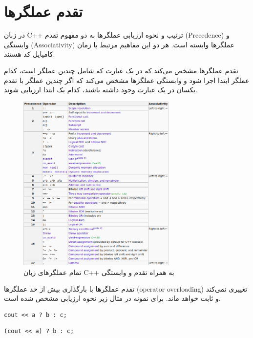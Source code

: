 \documentclass{article}
\begin{document}
\section*{تقدم عملگر‌ها}

در زبان C++ ترتیب و نحوه ارزیابی عملگر‌ها به دو مفهوم تقدم (Precedence) و وابستگی (Associativity) عملگر‌ها وابسته است. هر دو این مفاهیم مرتبط با زمان کامپایل کد هستند.

تقدم عملگرها مشخص می‌کند که در یک عبارت که شامل چندین عملگر است، کدام عملگر ابتدا اجرا شود و وابستگی عملگرها مشخص می‌کند که اگر چندین عملگر با تقدم یکسان در یک عبارت وجود داشته باشند، کدام یک ابتدا ارزیابی شوند.

\begin{figure}[h!]
    \centering
    \includegraphics[width=0.7\textwidth]{Photos/1-operations.png}
    \caption{تمام عملگرهای زبان C++ به همراه تقدم و وابستگی}
    \label{fig:example}
\end{figure}

تقدم عملگر‌ها با بارگذاری بیش از حد عملگر‌ها (operator overloading) تغییری نمی‌کند و ثابت خواهد ماند.
برای نمونه در مثال زیر نحوه ارزیابی مشخص شده است.

\begin{LTR} %
\begin{lstlisting}
cout << a ? b : c;
\end{lstlisting}
\end{LTR}

\begin{LTR} %
\begin{lstlisting}
(cout << a) ? b : c;
\end{lstlisting}
\end{LTR}
\end{document}
